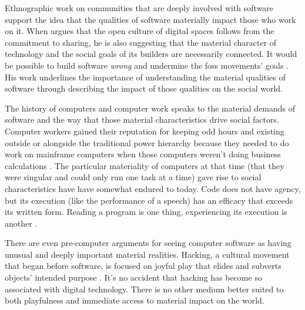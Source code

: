 \documentclass[a4paper,man,natbib,floatsintext]{apa6}
\begin{document}
  Ethnographic work on communities that are deeply involved with software support the idea that the qualities of software materially impact those who work on it. When \citet{Kelty2008-jm} argues that the open culture of digital spaces follows from the commitment to sharing, he is also suggesting that the material character of technology and the social goals of its builders are necessarily connected. It would be possible to build software \textit{wrong} and undermine the \gls{foss} movements' goals \citep{Kelty2008-jm}. His work underlines the importance of understanding the material qualities of software through describing the impact of those qualities on the social world.

  The history of computers and computer work speaks to the material demands of software and the way that those material characteristics drive social factors. Computer workers gained their reputation for keeping odd hours and existing outside or alongside the traditional power hierarchy because they needed to do work on mainframe computers when those computers weren't doing business calculations \citep{Ensmenger2012-kz}. The particular materiality of computers at that time (that they were singular and could only run one task at a time) gave rise to social characteristics have have somewhat endured to today. Code does not have agency, but its execution (like the performance of a speech) has an efficacy that exceeds its written form. Reading a program is one thing, experiencing its execution is another \citep{Cox2013-zo}.

  There are even pre-computer arguments for seeing computer software as having unusual and deeply important material realities. Hacking, a cultural movement that began before software, is focused on joyful play that elides and subverts objects' intended purpose \citep{Drexler2019-ja,Gabriella_Coleman2012-lq}. It's no accident that hacking has become so associated with digital technology. There is no other medium better suited to both playfulness and immediate access to material impact on the world.
\end{document}
